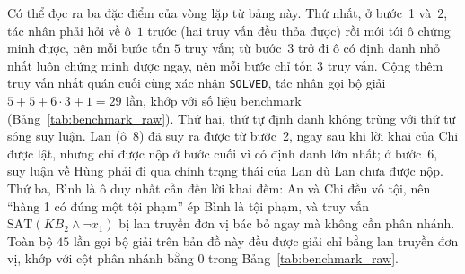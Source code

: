 \begin{sloppypar}
Có thể đọc ra ba đặc điểm của vòng lặp từ bảng này. Thứ nhất, ở bước~1 và~2,
tác nhân phải hỏi về ô~$1$ trước (hai truy vấn đều thỏa được) rồi mới tới ô
chứng minh được, nên mỗi bước tốn $5$ truy vấn; từ bước~3 trở đi ô có định danh
nhỏ nhất luôn chứng minh được ngay, nên mỗi bước chỉ tốn $3$ truy vấn. Cộng
thêm truy vấn nhất quán cuối cùng xác nhận \texttt{SOLVED}, tác nhân gọi bộ
giải $5+5+6\cdot3+1 = 29$ lần, khớp với số liệu benchmark
(Bảng~\ref{tab:benchmark_raw}). Thứ hai, thứ tự định danh không trùng với thứ
tự sóng suy luận. Lan (ô~$8$) đã suy ra được từ bước~2, ngay sau khi lời khai của
Chi được lật, nhưng chỉ được nộp ở bước cuối vì có định danh lớn nhất; ở bước~6,
suy luận về Hùng phải đi qua chính trạng thái của Lan dù Lan chưa được nộp.
Thứ ba, Bình là ô duy nhất cần đến lời khai đếm: An và Chi đều vô tội, nên
``hàng 1 có đúng một tội phạm'' ép Bình là tội phạm, và truy vấn
$\mathrm{SAT}(\mathit{KB}_2 \land \neg x_1)$ bị lan truyền đơn vị bác bỏ ngay
mà không cần phân nhánh. Toàn bộ $45$ lần gọi bộ giải trên bản đồ này đều được
giải chỉ bằng lan truyền đơn vị, khớp với cột phân nhánh bằng $0$ trong
Bảng~\ref{tab:benchmark_raw}.
\end{sloppypar}
